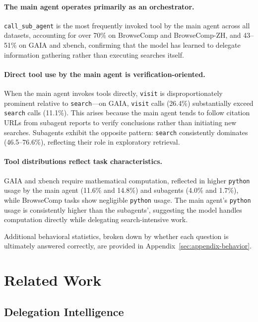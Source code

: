\documentclass[table]{gtech}
\begin{document}
\paragraph{The main agent operates primarily as an orchestrator.} \texttt{call\_sub\_agent} is the most frequently invoked tool by the main agent across all datasets, accounting for over 70\% on BrowseComp and BrowseComp-ZH, and 43--51\% on GAIA and xbench, confirming that the model has learned to delegate information gathering rather than executing searches itself.

\paragraph{Direct tool use by the main agent is verification-oriented.} When the main agent invokes tools directly, \texttt{visit} is disproportionately prominent relative to \texttt{search}---on GAIA, \texttt{visit} calls (26.4\%) substantially exceed \texttt{search} calls (11.1\%). This arises because the main agent tends to follow citation URLs from subagent reports to verify conclusions rather than initiating new searches. Subagents exhibit the opposite pattern: \texttt{search} consistently dominates (46.5--76.6\%), reflecting their role in exploratory retrieval.

\paragraph{Tool distributions reflect task characteristics.} GAIA and xbench require mathematical computation, reflected in higher \texttt{python} usage by the main agent (11.6\% and 14.8\%) and subagents (4.0\% and 1.7\%), while BrowseComp tasks show negligible \texttt{python} usage. The main agent's \texttt{python} usage is consistently higher than the subagents', suggesting the model handles computation directly while delegating search-intensive work.

Additional behavioral statistics, broken down by whether each question is ultimately answered correctly, are provided in Appendix~\ref{sec:appendix-behavior}.
\section{Related Work}
\label{sec:related}

\subsection{Delegation Intelligence}
\end{document}
